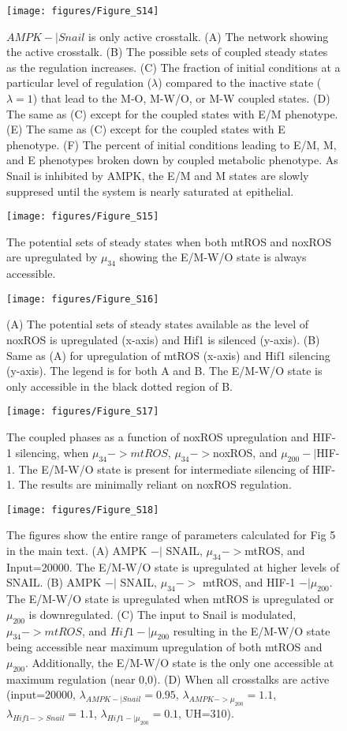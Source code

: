\documentclass{article}
\begin{document}
\begin{figure}
\texttt{[image: figures/Figure\_S14]}
\caption{$AMPK -| Snail$ is only active crosstalk. (A) The network showing the active crosstalk. (B) The possible sets of coupled steady states as the regulation increases. (C) The fraction of initial conditions at a particular level of regulation ($\lambda$) compared to the inactive state ($\lambda=1$) that lead to the M-O, M-W/O, or M-W coupled states. (D) The same as (C) except for the coupled states with E/M phenotype. (E) The same as (C) except for the coupled states with E phenotype. (F) The percent of initial conditions leading to E/M, M, and E phenotypes broken down by coupled metabolic phenotype. As Snail is inhibited by AMPK, the E/M and M states are slowly suppresed until the system is nearly saturated at epithelial. }
\end{figure}

\begin{figure}
\texttt{[image: figures/Figure\_S15]}
\caption{The potential sets of steady states when both mtROS and noxROS are upregulated by $\mu_{34}$ showing the E/M-W/O state is always accessible. }
\end{figure}

\begin{figure}
\texttt{[image: figures/Figure\_S16]}
\caption{(A) The potential sets of steady states available as the level of noxROS is upregulated (x-axis) and Hif1 is silenced (y-axis). (B) Same as (A) for upregulation of mtROS (x-axis) and Hif1 silencing (y-axis). The legend is for both A and B. The E/M-W/O state is only accessible in the black dotted region of B. }
\end{figure} 


\begin{figure}
\texttt{[image: figures/Figure\_S17]}
\caption{The coupled phases as a function of noxROS upregulation and HIF-1 silencing, when $\mu_{34}->mtROS$, $\mu_{34}->$noxROS, and $\mu_{200}-| $HIF-1. The E/M-W/O state is present for intermediate silencing of HIF-1. The results are minimally reliant on noxROS regulation.}
\end{figure}

\begin{figure}
\texttt{[image: figures/Figure\_S18]}
\caption{The figures show the entire range of parameters calculated for Fig 5 in the main text. (A) AMPK $-|$ SNAIL, $\mu_{34}->$mtROS, and Input=20000. The E/M-W/O state is upregulated at higher levels of SNAIL.  (B) AMPK $-|$ SNAIL, $\mu_{34}->$ mtROS, and HIF-1 $-|\mu_{200}$. The E/M-W/O state is upregulated when mtROS is upregulated or $\mu_{200}$ is downregulated. (C) The input to Snail is modulated, $\mu_{34}->mtROS$, and $Hif1-|\mu_{200}$ resulting in the E/M-W/O state being accessible near maximum upregulation of both mtROS and $\mu_{200}$. Additionally, the E/M-W/O state is the only one accessible at maximum regulation (near 0,0). (D) When all crosstalks are active (input=20000, $\lambda_{AMPK-|Snail} = 0.95$, $\lambda_{AMPK->\mu_{200}} =1.1$, $\lambda_{Hif1->Snail} = 1.1$,   $\lambda_{Hif1-|\mu_{200}} = 0.1$, UH=310).}
\end{figure}
\end{document}
